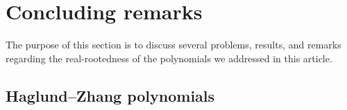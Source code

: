 \documentclass[11pt, a4paper, english]{amsart}
\theoremstyle{teoremas}
\theoremstyle{definition}
\DeclareMathOperator{\rk}{rk}
\newcommand{\M}{\mathsf{M}}
\newcommand{\gr}{\operatorname{gr}}
\newcommand{\VRep}{\operatorname{VRep}}
\newcommand{\Ind}{\operatorname{Ind}}
\begin{document}
\begin{comment}
    \end{align*}
    Therefore, the coefficient corresponding to $[\varnothing]$ is
    \[
        [\varnothing] \, \Delta^{W_i}(\upzeta[E]^{W_i})  = \left(\upzeta_{\varnothing}^E \right)^{W_i} + x^{-1}\left(\upzeta_{\{i\}}^E \right)^{W_i} = x^k \left( P_\M^{W_i}(x^{-2}) + x^{-2} P_{\M/ \{i\}}^{W_i}(x^{-2}) \right).
    \]
    Similarly, we can write
    \[
    \Delta^{W_i}(\upzeta[E]^{W_i}) = \upzeta[E\smallsetminus \{i\}]^{W_i} + \sum_{\substack{[F] \in \mathscr{S}_i /W_i\\ F \neq E\smallsetminus \{i\}}} \Ind_{W_F\cap W_i}^{W_i}\left( \tau(\M/(F\cup \{i\}))^{W_F\cap W_i} \boxtimes \upzeta[F]^{W_F\cap W_i} \right),
    \]
    and taking again the coefficient of $[\varnothing]$ we obtain
    \begin{align*}
    &[\varnothing]\Delta^{W_i}(\upzeta[E]^{W_i})\\ 
    &= x^k \left(P_{\M \smallsetminus \{i\}}^{W_i}(x^{-2}) + \sum_{[F] \in \mathscr{S}_i/W_i} x^{-(k - \rk(F))} \Ind_{W_F\cap W_i}^{W_i} \left( \tau(\M/{(F\cup \{i\})})^{W_F\cap W_i} \boxtimes P_{\M|_F}^{W_F\cap W_i}(x^{-2})\right)\right).
    \end{align*}
    Dividing by $x^k$ yields the first result after a change of variable, with $x$ in place of $x^{-2}$. The proof for $Z_{\M}^{W_i}(x)$ is entirely analogous and relies on the definition of the $\gr_\mathbb{Z}\VRep(W_i)$-module map $\Phi_{\M}^{W_i}\colon\mathcal{H}^{W_i}(\M) \to \gr_\mathbb{Z}\VRep(W_i)$ given by
    \[
     \sum_{[F] \in \mathcal{L}(\M)/W_i} \alpha_F \, [F] \enspace \stackrel{\Phi_{\M}^{W_i}}{\longmapsto}\enspace \sum_{[F] \in \mathcal{L}(\M)/W_i} x^{-\rk_\M(F)} \alpha_F.
    \qedhere\]
\end{proof}
\end{comment}

\section{Concluding remarks}\label{sec:five}

The purpose of this section is to discuss several problems, results, and remarks regarding the real-rootedness of the polynomials we addressed in this article. 

\subsection{Haglund--Zhang polynomials}\label{subsec:haglund-zhang}
\end{document}
